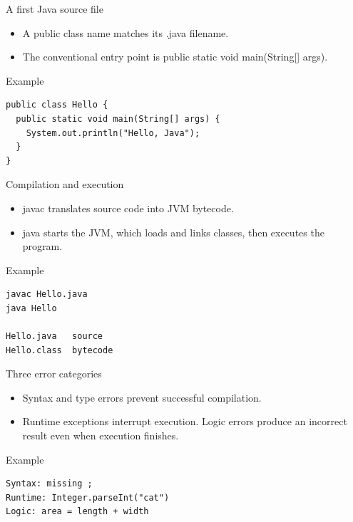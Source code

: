 \documentclass[10pt,aspectratio=169]{beamer}
\begin{document}
\begin{frame}[fragile,t]{A first Java source file}
\begin{itemize}
\item A public class name matches its .java filename.
\item The conventional entry point is public static void main(String[] args).
\end{itemize}
\vspace{1mm}\begin{block}{Example}
\begin{lstlisting}
public class Hello {
  public static void main(String[] args) {
    System.out.println("Hello, Java");
  }
}
\end{lstlisting}
\end{block}
\end{frame}

\begin{frame}[fragile,t]{Compilation and execution}
\begin{itemize}
\item javac translates source code into JVM bytecode.
\item java starts the JVM, which loads and links classes, then executes the program.
\end{itemize}
\vspace{1mm}\begin{block}{Example}
\begin{lstlisting}
javac Hello.java
java Hello

Hello.java   source
Hello.class  bytecode
\end{lstlisting}
\end{block}
\end{frame}

\begin{frame}[fragile,t]{Three error categories}
\begin{itemize}
\item Syntax and type errors prevent successful compilation.
\item Runtime exceptions interrupt execution. Logic errors produce an incorrect result even when execution finishes.
\end{itemize}
\vspace{1mm}\begin{block}{Example}
\begin{lstlisting}
Syntax: missing ;
Runtime: Integer.parseInt("cat")
Logic: area = length + width
\end{lstlisting}
\end{block}
\end{frame}
\end{document}
